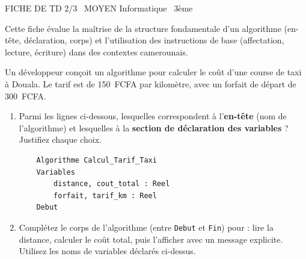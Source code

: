 \documentclass[11pt]{article}
\begin{document}
\begin{tcolorbox}[enhanced,colback=popink,colframe=popink,arc=10pt,boxrule=0pt,left=12pt,right=12pt,top=9pt,bottom=9pt]
{\color{white}\popxbold\small FICHE DE TD 2/3 \textbullet\ MOYEN \hfill Informatique \textbullet\ 3ème\par}
\end{tcolorbox}
\vspace{4pt}
Cette fiche évalue la maîtrise de la structure fondamentale d'un algorithme (en-tête, déclaration, corps) et l'utilisation des instructions de base (affectation, lecture, écriture) dans des contextes camerounais.

\begin{exercice}
Un développeur conçoit un algorithme pour calculer le coût d'une course de taxi à Douala. Le tarif est de \SI{150}{FCFA} par kilomètre, avec un forfait de départ de \SI{300}{FCFA}.
\begin{enumerate}
    \item Parmi les lignes ci-dessous, lesquelles correspondent à l'\textbf{en-tête} (nom de l'algorithme) et lesquelles à la \textbf{section de déclaration des variables} ? Justifiez chaque choix.
    \begin{verbatim}
    Algorithme Calcul_Tarif_Taxi
    Variables
        distance, cout_total : Reel
        forfait, tarif_km : Reel
    Debut
    \end{verbatim}
    \item Complétez le corps de l'algorithme (entre \texttt{Debut} et \texttt{Fin}) pour : lire la distance, calculer le coût total, puis l'afficher avec un message explicite. Utilisez les noms de variables déclarés ci-dessus.
\end{enumerate}
\end{exercice}
\end{document}
